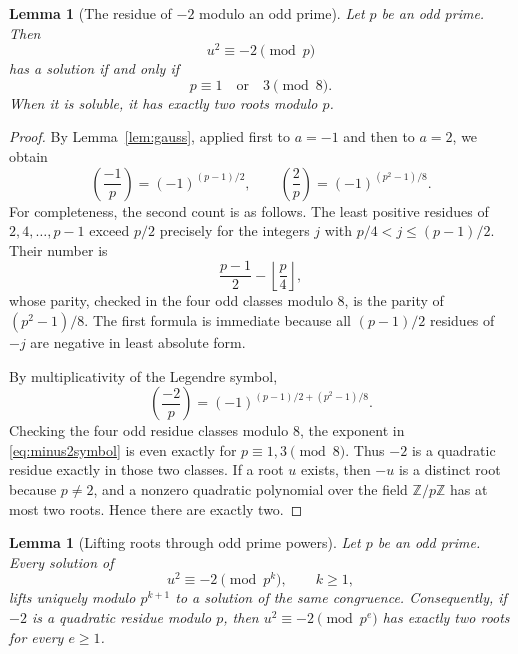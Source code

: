 \documentclass[11pt,a4paper]{amsart}
\numberwithin{equation}{section}
\newtheorem{lemma}[theorem]{Lemma}
\theoremstyle{definition}
\newcommand{\Z}{\mathbb Z}
\begin{document}
\begin{lemma}[The residue of \(-2\) modulo an odd prime]\label{lem:minus2prime}
Let \(p\) be an odd prime.  Then
\begin{equation}
 u^2\equiv-2\pmod p
 \label{eq:minus2modp}
\end{equation}
has a solution if and only if
\begin{equation}
 p\equiv1\quad\text{or}\quad3\pmod8.
 \label{eq:presidueclasses}
\end{equation}
When it is soluble, it has exactly two roots modulo \(p\).
\end{lemma}

\begin{proof}
By Lemma~\ref{lem:gauss}, applied first to \(a=-1\) and then to
\(a=2\), we obtain
\begin{equation}
 \left(\frac{-1}{p}\right)=(-1)^{(p-1)/2},
 \qquad
 \left(\frac{2}{p}\right)=(-1)^{(p^2-1)/8}.
 \label{eq:supplementarylaws}
\end{equation}
For completeness, the second count is as follows.  The least positive
residues of \(2,4,\ldots,p-1\) exceed \(p/2\) precisely for the
integers \(j\) with \(p/4<j\le(p-1)/2\).  Their number is
\begin{equation*}
 \frac{p-1}{2}-\left\lfloor\frac p4\right\rfloor,
\end{equation*}
whose parity, checked in the four odd classes modulo \(8\), is the
parity of \((p^2-1)/8\).  The first formula is immediate because all
\((p-1)/2\) residues of \(-j\) are negative in least absolute form.

By multiplicativity of the Legendre symbol,
\begin{equation}
 \left(\frac{-2}{p}\right)
 =(-1)^{(p-1)/2+(p^2-1)/8}.
 \label{eq:minus2symbol}
\end{equation}
Checking the four odd residue classes modulo \(8\), the exponent in
\eqref{eq:minus2symbol} is even exactly for \(p\equiv1,3\pmod8\).
Thus \(-2\) is a quadratic residue exactly in those two classes.
If a root \(u\) exists, then \(-u\) is a distinct root because
\(p\ne2\), and a nonzero quadratic polynomial over the field
\(\Z/p\Z\) has at most two roots.  Hence there are exactly two.
\end{proof}

\begin{lemma}[Lifting roots through odd prime powers]\label{lem:lifting}
Let \(p\) be an odd prime.  Every solution of
\begin{equation}
 u^2\equiv-2\pmod{p^k},\qquad k\ge1,
 \label{eq:liftstart}
\end{equation}
lifts uniquely modulo \(p^{k+1}\) to a solution of the same congruence.
Consequently, if \(-2\) is a quadratic residue modulo \(p\), then
\(u^2\equiv-2\pmod{p^e}\) has exactly two roots for every \(e\ge1\).
\end{lemma}
\end{document}
